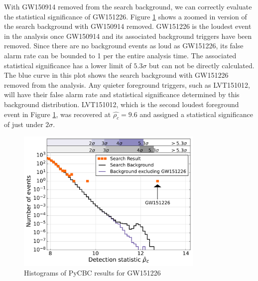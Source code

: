 With GW150914 removed from the search background, we can correctly evaluate the 
statistical significance of GW151226. 
Figure \ref{fig:pycbc-hist-gw151226} shows a zoomed in version
of the search background with GW150914 removed. 
GW151226 is the loudest event in the analysis once GW150914 and its associated 
background triggers have been removed. Since there are no background events 
as loud as GW151226, its false alarm rate can be bounded to 1 per the entire 
analysis time. The associated statistical significance has a lower limit of 
$5.3\sigma$ but can not be directly calculated. The blue curve in this plot 
shows the search background with GW151226 removed from the analysis. Any 
quieter foreground triggers, such as LVT151012, will have their false alarm 
rate and statistical significance determined by this background distribution.  
LVT151012, which is the second loudest foreground event in Figure 
\ref{fig:pycbc-hist-gw151226}, was recovered at $\hat{\rho_c} = 9.6$ and 
assigned a statistical significance of just under $2\sigma$.  

\begin{figure}[ht!]%
\includegraphics[width=0.8\textwidth]{figures/O1/pycbc_hist_GW151226}
\caption[PyCBC result histograms for GW151226]{Histograms of PyCBC results for GW151226}
\label{fig:pycbc-hist-gw151226}
\end{figure}

